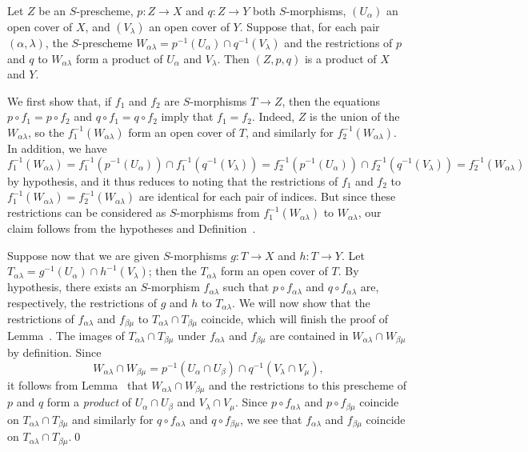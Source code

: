 \begin{lemma}[3.2.6.2]
\label{I.3.2.6.2}
Let $Z$ be an $S$-prescheme, $p:Z\to X$ and $q:Z\to Y$ both $S$-morphisms, $(U_\alpha)$ an open
cover of $X$, and $(V_\lambda)$ an open cover of $Y$. Suppose that, for each pair
$(\alpha,\lambda)$, the $S$-prescheme
$W_{\alpha\lambda}=p^{-1}(U_\alpha)\cap q^{-1}(V_\lambda)$ and the restrictions of $p$ and
$q$ to $W_{\alpha\lambda}$ form a product of $U_\alpha$ and $V_\lambda$. Then $(Z,p,q)$ is a
product of $X$ and $Y$.
\end{lemma}

We first show that, if $f_1$ and $f_2$ are $S$-morphisms $T\to Z$, then the equations
$p\circ f_1=p\circ f_2$ and $q\circ f_1=q\circ f_2$ imply that $f_1=f_2$. Indeed, $Z$ is the union
of the $W_{\alpha\lambda}$, so the $f_1^{-1}(W_{\alpha\lambda})$ form an open cover of $T$,
and similarly for $f_2^{-1}(W_{\alpha\lambda})$. In addition, we have
\[
  f_1^{-1}(W_{\alpha\lambda})=f_1^{-1}(p^{-1}(U_\alpha))\cap f_1^{-1}(q^{-1}(V_\lambda))
  =f_2^{-1}(p^{-1}(U_\alpha))\cap f_2^{-1}(q^{-1}(V_\lambda))=f_2^{-1}(W_{\alpha\lambda})
\]
by hypothesis, and it thus reduces to noting that the restrictions of $f_1$ and $f_2$ to
$f_1^{-1}(W_{\alpha\lambda})=f_2^{-1}(W_{\alpha\lambda})$ are identical for each pair of
indices. But since these restrictions can be considered as $S$-morphisms from
$f_1^{-1}(W_{\alpha\lambda})$ to $W_{\alpha\lambda}$, our claim follows from the
hypotheses and Definition~.

Suppose now that we are given $S$-morphisms $g:T\to X$ and $h:T\to Y$. Let
$T_{\alpha\lambda}=g^{-1}(U_\alpha)\cap h^{-1}(V_\lambda)$; then the $T_{\alpha\lambda}$ form an
open cover of $T$. By hypothesis, there exists an $S$-morphism $f_{\alpha\lambda}$ such that
$p\circ f_{\alpha\lambda}$ and $q\circ f_{\alpha\lambda}$ are, respectively, the restrictions of
$g$ and $h$ to $T_{\alpha\lambda}$. We will now show that the restrictions of
$f_{\alpha\lambda}$ and $f_{\beta\mu}$ to $T_{\alpha\lambda}\cap T_{\beta\mu}$ coincide,
which will finish the proof of Lemma~. The images of
$T_{\alpha\lambda}\cap T_{\beta\mu}$ under $f_{\alpha\lambda}$ and $f_{\beta\mu}$ are
contained in $W_{\alpha\lambda}\cap W_{\beta\mu}$ by definition. Since
\[
  W_{\alpha\lambda}\cap W_{\beta\mu}
  =p^{-1}(U_\alpha\cap U_\beta)\cap q^{-1}(V_\lambda\cap V_\mu),
\]
it follows from Lemma~ that $W_{\alpha\lambda}\cap W_{\beta\mu}$ and the
restrictions to this prescheme of $p$ and $q$ form a \emph{product} of $U_\alpha\cap U_\beta$
and $V_\lambda\cap V_\mu$. Since $p\circ f_{\alpha\lambda}$ and $p\circ f_{\beta\mu}$ coincide
on $T_{\alpha\lambda}\cap T_{\beta\mu}$ and similarly for $q\circ f_{\alpha\lambda}$ and
$q\circ f_{\beta\mu}$, we see that $f_{\alpha\lambda}$ and $f_{\beta\mu}$ coincide on
$T_{\alpha\lambda}\cap T_{\beta\mu}$.\qed

